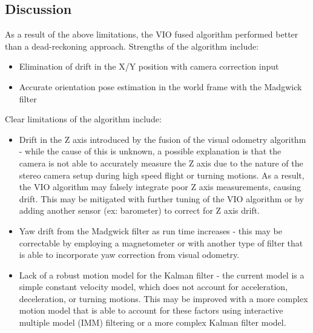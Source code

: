 \documentclass[bare_jrnl_transmag]{subfiles}
\begin{document}
\subsection{Discussion}
As a result of the above limitations, the VIO fused algorithm performed better than a dead-reckoning approach. Strengths of the algorithm include:
\begin{itemize}
    \item Elimination of drift in the X/Y position with camera correction input
    \item Accurate orientation pose estimation in the world frame with the Madgwick filter 
\end{itemize}

Clear limitations of the algorithm include:
\begin{itemize}
    \item Drift in the Z axis introduced by the fusion of the visual odometry algorithm - while the cause of this is unknown, a possible explanation is that the camera is not able to accurately measure the Z axis due to the nature of the stereo camera setup during high speed flight or turning motions. As a result, the VIO algorithm may falsely integrate poor Z axis measurements, causing drift. This may be mitigated with further tuning of the VIO algorithm or by adding another sensor (ex: barometer) to correct for Z axis drift.
    \item Yaw drift from the Madgwick filter as run time increases - this may be correctable by employing a magnetometer or with another type of filter that is able to incorporate yaw correction from visual odometry. 
    \item Lack of a robust motion model for the Kalman filter - the current model is a simple constant velocity model, which does not account for acceleration, deceleration, or turning motions. This may be improved with a more complex motion model that is able to account for these factors using interactive multiple model (IMM) filtering or a more complex Kalman filter model.
\end{itemize}
\end{document}
